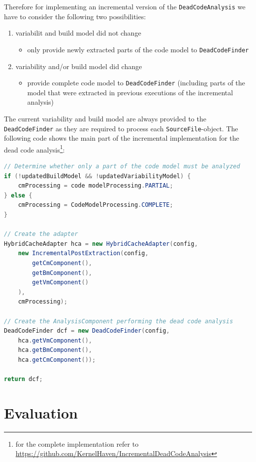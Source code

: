 \documentclass[a4paper]{article}
\begin{document}
Therefore for implementing an incremental version of the \texttt{Dead\-Code\-Analysis} we have to consider the following two possibilities:

\begin{enumerate}
 \item variabilit and build model did not change
 \begin{itemize}
 	\item only provide newly extracted parts of the code model to \texttt{Dead\-Code\-Finder}
 \end{itemize}
  \item variability and/or build model did change
 \begin{itemize}
 	\item provide complete code model to \texttt{Dead\-Code\-Finder} (including parts of the model that were extracted in previous executions of the incremental analysis)
 \end{itemize}
\end{enumerate}

The current variability and build model are always provided to the \texttt{Dead\-Code\-Finder} as they are required to process each \texttt{Source\-File}-object. The following code shows the main part of the incremental implementation for the dead code analysis\footnote{for the complete implementation refer to \url{https://github.com/KernelHaven/IncrementalDeadCodeAnalysis}}:

\begin{lstlisting}[language=java]
// Determine whether only a part of the code model must be analyzed
if (!updatedBuildModel && !updatedVariabilityModel) {
    cmProcessing = code modelProcessing.PARTIAL;
} else {
    cmProcessing = CodeModelProcessing.COMPLETE;
}

// Create the adapter
HybridCacheAdapter hca = new HybridCacheAdapter(config,
    new IncrementalPostExtraction(config, 
        getCmComponent(), 
        getBmComponent(), 
        getVmComponent()
    ),
    cmProcessing);

// Create the AnalysisComponent performing the dead code analysis
DeadCodeFinder dcf = new DeadCodeFinder(config, 
    hca.getVmComponent(), 
    hca.getBmComponent(),
    hca.getCmComponent());

return dcf;
\end{lstlisting}

\newpage
\section{Evaluation}\label{evaluation}
\end{document}
